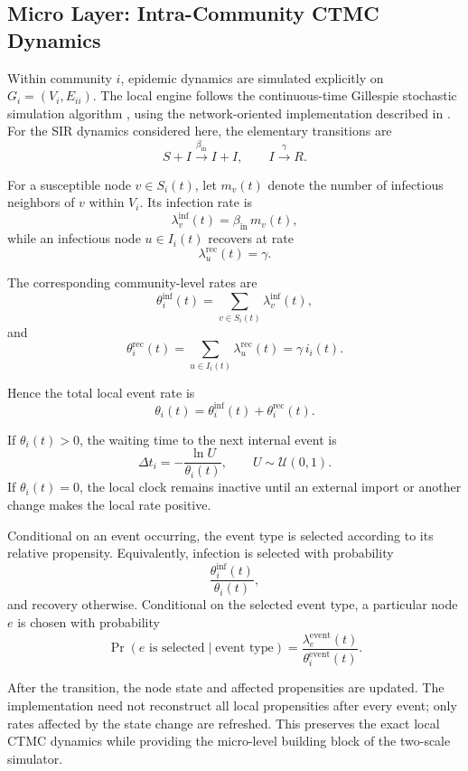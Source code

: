 \documentclass[a4paper,fleqn]{cas-sc}
\begin{document}
\subsection{Micro Layer: Intra-Community CTMC Dynamics}

Within community $i$, epidemic dynamics are simulated explicitly on $G_i=(V_i,E_{ii})$. The local engine follows the continuous-time Gillespie stochastic simulation algorithm \cite{gillespie1977exact}, using the network-oriented implementation described in \cite{kuryliak2025simulating}. For the SIR dynamics considered here, the elementary transitions are
\[
S+I
\xrightarrow{\beta_{\mathrm{in}}}
I+I,
\qquad
I
\xrightarrow{\gamma}
R.
\]

For a susceptible node $v\in S_i(t)$, let $m_v(t)$ denote the number of infectious neighbors of $v$ within $V_i$. Its infection rate is
\[
\lambda^{\mathrm{inf}}_v(t)
=
\beta_{\mathrm{in}}\,m_v(t),
\]
while an infectious node $u\in I_i(t)$ recovers at rate
\[
\lambda^{\mathrm{rec}}_u(t)
=
\gamma.
\]

The corresponding community-level rates are
\[
\theta_i^{\mathrm{inf}}(t)
=
\sum_{v\in S_i(t)}
\lambda^{\mathrm{inf}}_v(t),
\]
and
\[
\theta_i^{\mathrm{rec}}(t)
=
\sum_{u\in I_i(t)}
\lambda^{\mathrm{rec}}_u(t)
=
\gamma\,i_i(t).
\]

Hence the total local event rate is
\[
\theta_i(t)
=
\theta_i^{\mathrm{inf}}(t)
+
\theta_i^{\mathrm{rec}}(t).
\]

If $\theta_i(t)>0$, the waiting time to the next internal event is
\[
\Delta t_i
=
-\frac{\ln U}{\theta_i(t)},
\qquad
U\sim\mathcal{U}(0,1).
\]
If $\theta_i(t)=0$, the local clock remains inactive until an external import or another change makes the local rate positive.

Conditional on an event occurring, the event type is selected according to its relative propensity. Equivalently, infection is selected with probability
\[
\frac{\theta_i^{\mathrm{inf}}(t)}
{\theta_i(t)},
\]
and recovery otherwise. Conditional on the selected event type, a particular node $e$ is chosen with probability
\[
\Pr\!\left(
e\text{ is selected}\mid \text{event type}
\right)
=
\frac{\lambda_e^{\mathrm{event}}(t)}
{\theta_i^{\mathrm{event}}(t)}.
\]

After the transition, the node state and affected propensities are updated. The implementation need not reconstruct all local propensities after every event; only rates affected by the state change are refreshed. This preserves the exact local CTMC dynamics while providing the micro-level building block of the two-scale simulator.
\end{document}

